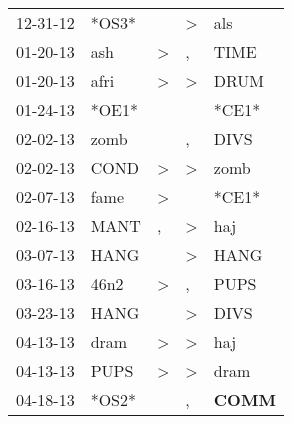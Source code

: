 \begin{supertabular}{p{0.07\textwidth}p{0.06\textwidth}p{0.02\textwidth}p{0.02\textwidth}p{0.06\textwidth}}
          12-31-12\textsuperscript{} &                            *OS3* &                  &     \textgreater &            als\textsuperscript{} \\
          01-20-13\textsuperscript{} &            ash\textsuperscript{} &     \textgreater &                , &           TIME\textsuperscript{} \\
          01-20-13\textsuperscript{} &           afri\textsuperscript{} &     \textgreater &     \textgreater &           DRUM\textsuperscript{} \\
          01-24-13\textsuperscript{} &                            *OE1* &                  &                  &                            *CE1* \\
          02-02-13\textsuperscript{} &           zomb\textsuperscript{} &                  &                , &           DIVS\textsuperscript{} \\
          02-02-13\textsuperscript{} &           COND\textsuperscript{} &     \textgreater &     \textgreater &           zomb\textsuperscript{} \\
          02-07-13\textsuperscript{} &           fame\textsuperscript{} &     \textgreater &                  &                            *CE1* \\
          02-16-13\textsuperscript{} &           MANT\textsuperscript{} &                , &     \textgreater &            haj\textsuperscript{} \\
          03-07-13\textsuperscript{} &           HANG\textsuperscript{} &                  &     \textgreater &           HANG\textsuperscript{} \\
          03-16-13\textsuperscript{} &           46n2\textsuperscript{} &     \textgreater &                , &           PUPS\textsuperscript{} \\
          03-23-13\textsuperscript{} &           HANG\textsuperscript{} &                  &     \textgreater &           DIVS\textsuperscript{} \\
          04-13-13\textsuperscript{} &           dram\textsuperscript{} &     \textgreater &     \textgreater &            haj\textsuperscript{} \\
          04-13-13\textsuperscript{} &           PUPS\textsuperscript{} &     \textgreater &     \textgreater &           dram\textsuperscript{} \\
          04-18-13\textsuperscript{} &                            *OS2* &                  &                , &  \textbf{COMM\textsuperscript{}} \\

\end{supertabular}
